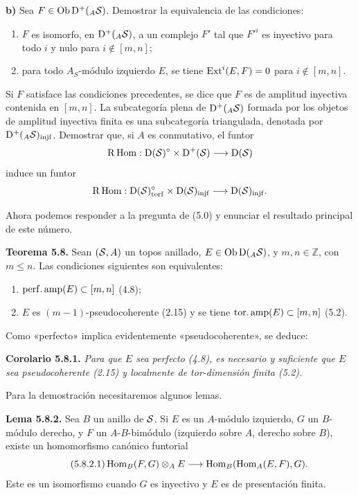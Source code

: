 \textbf{b)} Sea \(F\in\Ob\Dpx^+({}_A \sisi{S}{\mathcal S})\)\sgarepeatfootnotemark. Demostrar la equivalencia de las condiciones:
\begin{enumerate}[label=(\roman*)]
\item \(F\) es isomorfo, en \(\Dpx^+({}_A \sisi{S}{\mathcal S})\), a un complejo \(F'\) tal que \(F'^i\) es inyectivo para todo \(i\) y nulo para \(i\notin[m,n]\);
\item para todo \(A_S\)-módulo izquierdo \(E\), se tiene \(\Ext^i(E,F)=0\) para \(i\notin[m,n]\).
\end{enumerate}
Si \(F\) satisface las condiciones precedentes, se dice que \(F\) es de amplitud inyectiva contenida en \([m,n]\). La subcategoría plena de \(\Dpx^+({}_A \sisi{S}{\mathcal S})\) formada por los objetos de amplitud inyectiva finita es una subcategoría triangulada, denotada por \(\Dpx^+({}_A \sisi{S}{\mathcal S})_{\injf}\). Demostrar que, si \(A\) es conmutativo, el funtor
\[
  \mathrm R\Hom:\Dpx(\sisi{S}{\mathcal S})^\circ\times\Dpx^+(\sisi{S}{\mathcal S})\longrightarrow \Dpx(\sisi{S}{\mathcal S})
\]
induce un funtor
\[
  \mathrm R\Hom:\Dpx(\sisi{S}{\mathcal S})^\circ_{\torf}\times\Dpx(\sisi{S}{\mathcal S})_{\injf}
  \longrightarrow \Dpx(\sisi{S}{\mathcal S})_{\injf}.
\]

Ahora podemos responder a la pregunta de (5.0) y enunciar el resultado principal de este número.

\textbf{Teorema 5.8.} Sean \((\sisi{S}{\mathcal S},A)\) un topos anillado, \(E\in\Ob\Dpx({}_A \sisi{S}{\mathcal S})\), y \(m,n\in\mathbb Z\), con \(m\leq n\). Las condiciones siguientes son equivalentes:
\begin{enumerate}[label=(\roman*)]
\item \(\perfamp(E)\subset[m,n]\) (4.8);
\item \(E\) es \((m-1)\)-pseudocoherente (2.15) y se tiene \(\toramp(E)\subset[m,n]\) (5.2).
\end{enumerate}
Como «perfecto» implica evidentemente «pseudocoherente», se deduce:

\textbf{Corolario 5.8.1.} \emph{Para que \(E\) sea perfecto (4.8), es necesario y suficiente que \(E\) sea pseudocoherente (2.15) y localmente de tor-dimensión finita (5.2).}

Para la demostración necesitaremos algunos lemas.

\textbf{Lema 5.8.2.} Sea \(B\) un anillo de \(\sisi{S}{\mathcal S}\). Si \(E\) es un \(A\)-módulo izquierdo, \(G\) un \(B\)-módulo derecho, y \(F\) un \(A\)-\(B\)-bimódulo (izquierdo sobre \(A\), derecho sobre \(B\)), existe un homomorfismo canónico funtorial
\begin{equation}\tag{5.8.2.1}
  \Hom_B(F,G)\otimes_A E
  \longrightarrow
  \Hom_B(\Hom_A(E,F),G).
\end{equation}
Este es un isomorfismo cuando \(G\) es inyectivo y \(E\) es de presentación finita.

